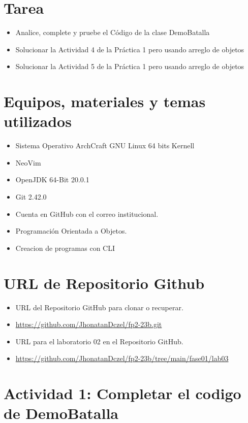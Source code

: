 \documentclass{article}
\begin{document}
	\section{Tarea}
	\begin{itemize}		
		\item Analice, complete y pruebe el Código de la clase DemoBatalla
            \item Solucionar la Actividad 4 de la Práctica 1 pero usando arreglo de objetos
            \item Solucionar la Actividad 5 de la Práctica 1 pero usando arreglo de objetos

	\end{itemize}
		
	\section{Equipos, materiales y temas utilizados}
	\begin{itemize}
		\item Sistema Operativo ArchCraft GNU Linux 64 bits Kernell
		\item NeoVim
		\item OpenJDK 64-Bit 20.0.1 
		\item Git 2.42.0
		\item Cuenta en GitHub con el correo institucional.
		\item Programación Orientada a Objetos.
		\item Creacion de programas con CLI	
	\end{itemize}
	
	\section{URL de Repositorio Github}
	\begin{itemize}
		\item URL del Repositorio GitHub para clonar o recuperar.
		\item \url{https://github.com/JhonatanDczel/fp2-23b.git}
		\item URL para el laboratorio 02 en el Repositorio GitHub.
		\item \url{https://github.com/JhonatanDczel/fp2-23b/tree/main/fase01/lab03}
	\end{itemize}


	\section{Actividad 1: Completar el codigo de DemoBatalla}
	
\end{document}
